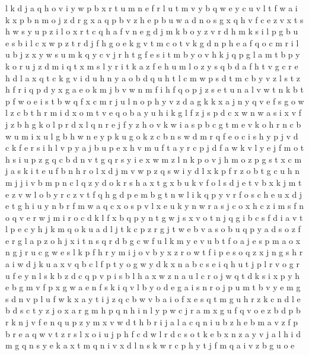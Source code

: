 \documentclass{article}
\begin{document}
l k d j a q h o v i y w p b x r t u m n e
f r l u t m v y b q w
e y c u v l t f w a i k x p b n m o j z d r g
x a q p b v z h e
p b u w a d n o s g x q h v f c
e z v x t s h
w s y u p z i l o x r t c q h a f v n e g d j m k b
o y z v r d h m k s i l p g b u e
s b i l c x w p z t r d j f h g o e k
g v t m c o
t v k g d n p h e a f q o c m r i l u b j z x y w s
u m k q y c v j r h
t g
f e s i t m b y o v h k j q p g l a
m t b p y k
o r u j z d m i q t
x m s l y r i t k a z f e h
u m l o z y s q b d a f h t v g c r e
h d l a x q t c k g v i
d u h n
y a o b d q u h t l c m w p
s d t m c b y v z
l s t z h f r i q p d y x g a e o k m j b v w n
m f
i h f q o p j z s e t u n a l v w
t
n k b t p f w o
e i s t b w q f x c m r j u l n o p h y v z d a g k
k x a j n y q v e f s g o w l z c b t h r m i d
x o
m t v e q o b a y u h i k g l f z j s p d c x w n
w a s i x v f j z b h g k o l p r
d x l q n r e j f y z h o v k w i a s p b c g t m
e v
k o h r n c b w u m
i x u l g b h w n e y p k
u g o k z c b n s w d m r q f e
o c i s h y
p j v d c k f e r s i h
l v p y a j b u
p e x h v m u f t a y r
c p j d f a w k
v l y e j f m o t h s i u p z g q c b d n
v
t g q r s y i e x w m z l n k p o v j h
m
o z p g s t x c m j
a s k i t e u f b n h r o l x d j m v w p z
q s w i y d l x k p f r z o b t g c u h n m j
j i v b m p n c l q z y d o k r s h a x t g
x b u k v f o l s d j e
t v b
x k j m
t e z v w l
o b y r c z v t f q h g d p e
m
b g t n w l i k q p y v r f o s c h e u x d
j e t g h i u y n b r f m w a q c x o s p v
l x e u k y n w r a s j c o
x h c z i m s f n o q v e r w j
m i r o c d k l f x b q p y n t g w j s
x v o t n j q g i b c s
f d i a v t l p e c y h j k m q o
k u a d l j t
k c p z r g j t w e b v a s o
b u q p y a d s o z f e r g l
a p z o h j x i t n s q r d b g c w f u l k m y e v
u b t f o a j e s p m
a o x n g j r u
c g w e s l k p f h r y m i j o v b
y
x z
r o w
t f i p e s o q z x
j n g s h r a
i w d j k u a x v q b c l f p t y o g
w y d k x n a b c s e i q h u t j p l r v o g
r u f e y n l s k b z d c q p v
p i s b l h a x w z
n a u l c r o j w q t d k s i x p y h e b g m v f
p x g w a e n f s k i q v l b y o d
e g a i s n r o j p u m t b v y
e m g s d n v p l u f w k x a y t i j z q c b
w v b a i o f x e s q t m g u h r z k c n d l
e b d s c t y z j o x a r g m h p q
n
h i n l y p w c j r a m x g u f q v o e z b d
p b r k n j v
f e n q u p z y m x v w d t h b r i j a
l a
c q n i u b z h
e b
m a v z f p b r
e a q w v t z r s l x o i u j p h f c d
w l r d c s o t k e b x n z a y v
j a l h i d m g q n s y e k
a x t m q n i v
x d l n s k w r c p h y t j f m q a i v z b g u o e
\end{document}

